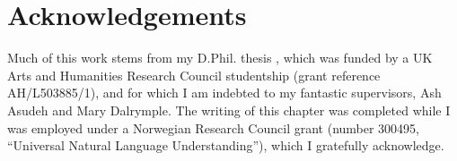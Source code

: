 \documentclass[output=paper,hidelinks]{langscibook}
\begin{document}

\section*{Acknowledgements}
Much of this work stems from my D.Phil. thesis \citep{findlay2019}, which was
funded by a UK Arts and Humanities Research Council studentship (grant reference
AH\slash L503885\slash 1), and for which I am indebted to my fantastic supervisors, Ash
Asudeh and Mary Dalrymple. The writing of this chapter was completed while I was
employed under a Norwegian Research Council grant (number 300495, ``Universal
Natural Language Understanding''), which I gratefully acknowledge.



\sloppy
\printbibliography[heading=subbibliography,notkeyword=this]
\end{document}
